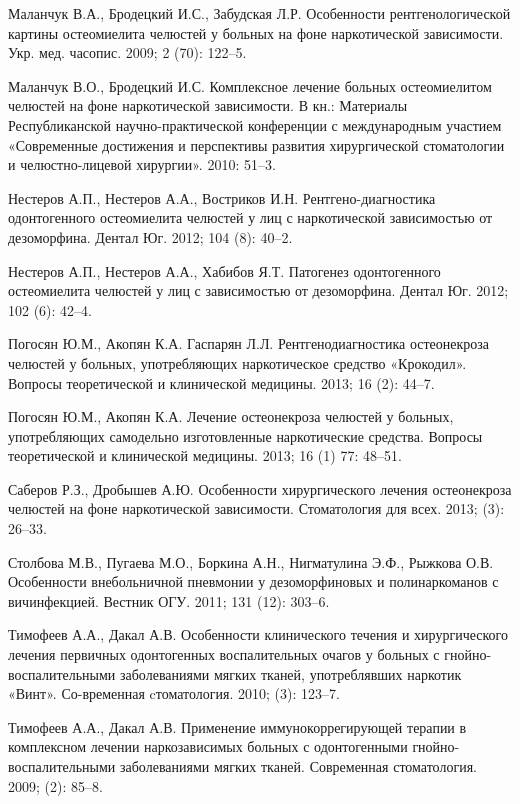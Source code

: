 \documentclass[11pt]{article}
\begin{document}
\begin{thebibliography}{3}
		   Маланчук  В.А.,  Бродецкий  И.С.,  Забудская  Л.Р.  Особенности рентгенологической картины остеомиелита челюстей у больных на фоне наркотической зависимости. Укр. мед. часопис. 2009; 2 (70): 122–5.
		
		   Маланчук В.О., Бродецкий И.С. Комплексное лечение больных остеомиелитом челюстей на фоне наркотической зависимости. В кн.: Материалы Республиканской научно-практической конференции с международным участием «Современные достижения и перспективы развития хирургической стоматологии и челюстно-лицевой хирургии». 2010: 51–3.
		
		   Нестеров  А.П.,  Нестеров  А.А.,  Востриков  И.Н.  Рентгено-диагностика одонтогенного остеомиелита челюстей у лиц с наркотической зависимостью от дезоморфина. Дентал Юг. 2012; 104 (8): 40–2.
		
		   Нестеров А.П., Нестеров А.А., Хабибов Я.Т. Патогенез одонтогенного остеомиелита челюстей у лиц с зависимостью от дезоморфина. Дентал Юг. 2012; 102 (6): 42–4.
		
		    Погосян Ю.М., Акопян К.А. Гаспарян Л.Л. Рентгенодиагностика остеонекроза челюстей у больных, употребляющих наркотическое средство «Крокодил». Вопросы теоретической и клинической медицины. 2013; 16 (2): 44–7.
		
		    Погосян Ю.М., Акопян К.А. Лечение остеонекроза челюстей у больных, употребляющих самодельно изготовленные наркотические средства. Вопросы теоретической и клинической медицины. 2013; 16 (1) 77: 48–51.
		
		    Саберов Р.З., Дробышев А.Ю. Особенности хирургического лечения остеонекроза челюстей на фоне наркотической зависимости. Стоматология для всех. 2013; (3): 26–33.
		
		    Столбова М.В., Пугаева М.О., Боркина А.Н., Нигматулина Э.Ф., Рыжкова О.В. Особенности внебольничной пневмонии у дезоморфиновых и полинаркоманов с вичинфекцией. Вестник ОГУ. 2011; 131 (12): 303–6.
		
		    Тимофеев А.А., Дакал А.В. Особенности клинического течения и  хирургического  лечения  первичных  одонтогенных  воспалительных очагов у больных с гнойно-воспалительными заболеваниями мягких тканей, употреблявших наркотик «Винт». Со-временная cтоматология. 2010; (3): 123–7.
		
		    Тимофеев  А.А.,  Дакал  А.В.  Применение  иммунокоррегирующей терапии в комплексном лечении наркозависимых больных с одонтогенными гнойно-воспалительными заболеваниями мягких тканей. Современная стоматология. 2009; (2): 85–8.
		

\end{thebibliography}
\end{document}

